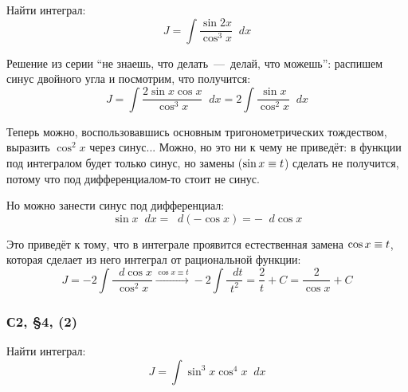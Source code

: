 \documentclass[a4paper,12pt]{article}
\newcommand{\diff}{\mathop{}\!d}
\begin{document}
  Найти интеграл:
  \begin{equation}
    J = \int \frac{\sin 2x}{\cos^3 x} \diff x
  \end{equation}
  
  \begin{solution}
    Решение из серии ``не знаешь, что делать~---~делай, что можешь'': распишем синус двойного угла и посмотрим, что получится:
    \[
      J = \int \frac{2 \sin x \cos x}{\cos^3 x} \diff x = 2 \int \frac{\sin x}{\cos^2 x} \diff x
    \]

    Теперь можно, воспользовавшись основным тригонометрических тождеством, выразить $\cos^2 x$ через синус...
    Можно, но это ни к чему не приведёт: в функции под интегралом будет только синус, но замены ($\sin x \hm\equiv t$) сделать не получится, потому что под дифференциалом-то стоит не синус.

    Но можно занести синус под дифференциал:
    \[
      \sin x \diff x = \diff (-\cos x) = -\diff \cos x
    \]

    Это приведёт к тому, что в интеграле проявится естественная замена $\cos x \hm\equiv t$, которая сделает из него интеграл от рациональной функции:
    \[
      J = -2\int \frac{\diff \cos x}{\cos^2 x} \xrightarrow[]{\cos x \equiv t} -2\int \frac{\diff t}{t^2} = \frac{2}{t} + C = \frac{2}{\cos x} + C
    \]
  \end{solution}


  \subsubsection{С2, \S 4, (2)}

  Найти интеграл:
  \begin{equation}
    J = \int \sin^3 x \cos^4 x \diff x
  \end{equation}
  
\end{document}
